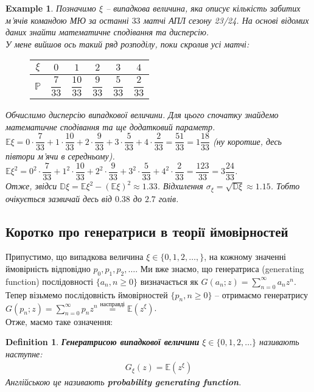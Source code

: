 \documentclass[a4paper, 10pt]{article}
\theoremstyle{theoremdd}
\newtheorem{definition}[theorem]{Definition}
\newtheorem{example}[theorem]{Example}
\begin{document}
\begin{example}
Позначимо $\xi$ -- випадкова величина, яка описує кількість забитих м'ячів командою МЮ за останні $33$ матчі АПЛ сезону 23/24. На основі відомих даних знайти математичне сподівання та дисперсію.\\
У мене вийшов ось такий ряд розподілу, поки скролив усі матчі:
\begin{figure}[H]
\centering
\begin{tabular}{c|c|c|c|c|c}
$\xi$ & $0$ & $1$ & $2$ & $3$ & $4$ \\
\hline
$\mathbb{P}$ & $\dfrac{7}{33}$ & $\dfrac{10}{33}$ & $\dfrac{9}{33}$ & $\dfrac{5}{33}$ & $\dfrac{2}{33}$
\end{tabular}
\end{figure}
\noindent
Обчислимо дисперсію випадкової величини. Для цього спочатку знайдемо математичне сподівання та ще додатковий параметр.\\
$\mathbb{E}\xi = 0 \cdot \dfrac{7}{33} + 1 \cdot \dfrac{10}{33} + 2 \cdot \dfrac{9}{33} + 3 \cdot \dfrac{5}{33} + 4 \cdot \dfrac{2}{33} = \dfrac{51}{33} = 1 \dfrac{18}{33}$ (ну коротше, десь півтори м'ячи в середньому).\\
$\mathbb{E}\xi^2 = 0^2 \cdot \dfrac{7}{33} + 1^2 \cdot \dfrac{10}{33} + 2^2 \cdot \dfrac{9}{33} + 3^2 \cdot \dfrac{5}{33} + 4^2 \cdot \dfrac{2}{33} = \dfrac{123}{33} = 3 \dfrac{24}{33}$.\\
Отже, звідси $\mathbb{D}\xi = \mathbb{E}\xi^2 - \left( \mathbb{E}\xi \right)^2 \approx 1.33$. Відхилення $\sigma_\xi = \sqrt{\mathbb{D}\xi} \approx 1.15$. Тобто очікується зазвичай десь від $0.38$ до $2.7$ голів.
\end{example}

\subsection{Коротко про генератриси в теорії ймовірностей}
Припустимо, що випадкова величина $\xi \in \{0,1,2,\dots,\}$, на кожному значенні ймовірність відповідно $p_0,p_1,p_2,\dots$. Ми вже знаємо, що генератриса (generating function) послідовності $\{a_n, n \geq 0\}$ визначається як $G(a_n;z) = \displaystyle\sum_{n=0}^\infty a_n z^n$. Тепер візьмемо послідовність ймовірностей $\{p_n, n \geq 0\}$ -- отримаємо генератрису $G(p_n;z) = \displaystyle\sum_{n=0}^\infty p_n z^n \overset{\text{насправді}}{=} \mathbb{E}(z^{\xi})$.\\
Отже, маємо таке означення:
\begin{definition}
\textbf{Генератрисою випадкової величини} $\xi \in \{0,1,2,\dots\}$ називають наступне:
\begin{align*}
G_\xi(z) = \mathbb{E}(z^\xi)
\end{align*}
Англійською це називають \textbf{probability generating function}.
\end{definition}
\end{document}
